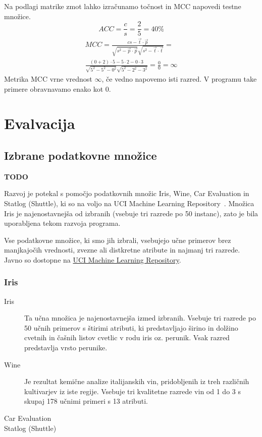 \documentclass[a4paper,12pt,openright]{book}
\begin{document}
    Na podlagi matrike zmot lahko izračunamo točnost in MCC napovedi testne množice.
    \begin{equation}
        ACC=\frac{c}{s}=\frac{2}{5}=40\%\label{eq:tocnost_primer}
    \end{equation}
    \begin{equation}
        \begin{split}
            MCC={\frac {cs-{\vec {t}}\cdot {\vec {p}}}{{\sqrt {s^{2}-{\vec {p}}\cdot {\vec {p}}}}{\sqrt {s^{2}-{\vec {t}}\cdot {\vec {t}}}}}}= \\
            \frac{(0+2)\cdot 5 - 5\cdot 2 - 0 \cdot 3}{\sqrt{5^2-5^2-0^2}\sqrt{5^2-2^2-3^2}}=\frac{0}{0} = \infty
        \end{split}\label{eq:mcc_primer}
    \end{equation}
    Metrika MCC vrne vrednost $\infty$, če vedno napovemo isti razred.
    V programu take primere obravnavamo enako kot $0$.

    \chapter{Evalvacija}\label{ch:evalvacija}

    \section{Izbrane podatkovne množice}\label{sec:izbrane-podatkovne-mnozice}
    \textbf{TODO}

    Razvoj je potekal s pomočjo podatkovnih množic Iris, Wine, Car Evaluation in Statlog (Shuttle), ki so
    na voljo na UCI Machine Learning Repository~\cite{Dua:2019}.
    Množica Iris je najenostavnejša od izbranih (vsebuje tri razrede po 50 instanc), zato je bila uporabljena tekom razvoja programa.

    Vse podatkovne množice, ki smo jih izbrali, vsebujejo učne primerov brez manjkajočih vrednosti,
    zvezne ali distkretne atribute in najmanj tri razrede.
    Javno so dostopne na \href{https://archive.ics.uci.edu/}{UCI Machine Learning Repository}.

    \subsection{Iris}\label{subsec:iris}

    \begin{description}
        \item[Iris]{ Ta učna množica je najenostavnejša izmed izbranih. Vsebuje tri razrede po 50 učnih primerov s štirimi atributi,
            ki predstavljajo širino in dolžino cvetnih in čašnih listov cvetlic v rodu iris oz. perunik. Vsak razred predstavlja vrsto perunike.  }
        \item[Wine]{Je rezultat kemične analize italijanskih vin, pridobljenih iz treh različnih kultivarjev iz iste regije.
        Vsebuje tri kvalitetne razrede vin od 1 do 3 s skupaj 178 učnimi primeri s 13 atributi. }
        \item[Car Evaluation]
        \item[Statlog (Shuttle)]
    \end{description}
\end{document}
